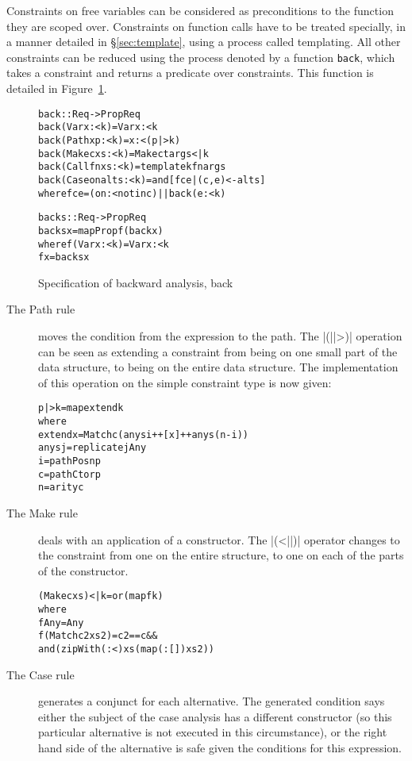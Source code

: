\documentclass[preprint]{sigplanconf}
\newcommand{\T}[1]{\texttt{#1}}
\newcommand{\C}[1]{\textsf{#1}}
\newenvironment{code}{\begin{alltt}\small}{\end{alltt}}
\begin{document}
Constraints on free variables can be considered as preconditions to the function they are scoped over. Constraints on function calls have to be treated specially, in a manner detailed in \S\ref{sec:template}, using a process called templating. All other constraints can be reduced using the process denoted by a function \T{back}, which takes a constraint and returns a predicate over constraints. This function is detailed in Figure~\ref{fig:backward}.

\begin{figure}
\begin{code}
back :: Req -> Prop Req
back (Var   x         :< k) = Var x :< k
back (Path  x   p     :< k) = x :< (p |> k)
back (Make  c   xs    :< k) = Make ct args <| k
back (Call  fn  xs    :< k) = template k fn args
back (Case  on  alts  :< k) = and [f c e | (c,e) <- alts]
    where f c e = (on :< notin c) || back (e :< k)

backs :: Req -> Prop Req
backs x = mapProp f (back x)
    where  f (Var x :< k) = Var x :< k
           f x = backs x
\end{code}
\caption{Specification of backward analysis, \C{back}}
\label{fig:backward}
\end{figure}

\begin{description}

\item[The \C{Path} rule] moves the condition from the expression to the path. The |(||>)| operation can be seen as extending a constraint from being on one small part of the data structure, to being on the entire data structure. The implementation of this operation on the simple constraint type is now given:

\begin{code}
p |> k = map extend k
    where
    extend x = Match c (anys i ++ [x] ++ anys (n-i))
    anys j = replicate j Any
    i = pathPosn p
    c = pathCtor p
    n = arity c
\end{code}

\item[The \C{Make} rule] deals with an application of a constructor. The |(<||)| operator changes to the constraint from one on the entire structure, to one on each of the parts of the constructor.

\begin{code}
(Make c xs) <| k = or (map f k)
    where
    f Any = Any
    f (Match c2 xs2) = c2 == c &&
        and (zipWith (:<) xs (map (:[]) xs2))
\end{code}


\item[The \C{Case} rule] generates a conjunct for each alternative. The generated condition says either the subject of the case analysis has a different constructor (so this particular alternative is not executed in this circumstance), or the right hand side of the alternative is safe given the conditions for this expression.
\end{description}
\end{document}
